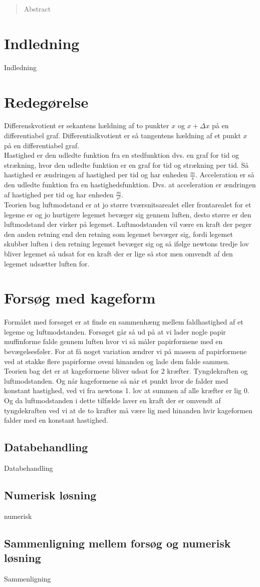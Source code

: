 \documentclass[12pt]{article}
\begin{document}
\tableofcontents
\pagebreak

\begin{abstract}
Abstract
\end{abstract}
\pagebreak

\section{Indledning}
Indledning
\section{Redegørelse}
Differenskvotient er sekantens hældning af to punkter $x$ og $x+\Delta x$ på en differentiabel graf.
Differentialkvotient er så tangentens hældning af et punkt $x$ på en differentiabel graf.\\
Hastighed er den udledte funktion fra en stedfunktion dvs. en graf for tid og strækning, hvor den udledte funktion er en graf for tid og strækning per tid. Så hastighed er ændringen af hastighed per tid og har enheden $\frac{m}{s}$.
Acceleration er så den udledte funktion fra en hastighedsfunktion. Dvs. at acceleration er ændringen af hastighed per tid og har enheden $\frac{m}{s^2}$.\\
Teorien bag luftmodstand er at jo større tværsnitsarealet eller frontarealet for et legeme er og jo hurtigere legemet bevæger sig gennem luften, desto større er den luftmodstand der virker på legemet. Luftmodstanden vil være en kraft der peger den anden retning end den retning som legemet bevæger sig,
fordi legemet skubber luften i den retning legemet bevæger sig og så ifølge newtons tredje lov bliver legemet så udsat for en kraft der er lige så stor men omvendt af den legemet udsætter luften for.


\section{Forsøg med kageform}
Formålet med forsøget er at finde en sammenhæng mellem faldhastighed af et legeme og luftmodstanden. Forsøget går så ud på at vi lader nogle papir muffinforme falde gennem luften
hvor vi så måler papirformene med en bevægelsesføler. For at få noget variation ændrer vi på massen af papirformene ved at stakke flere papirforme oveni hinanden og lade dem falde sammen.\\
Teorien bag det er at kageformene bliver udsat for 2 kræfter. Tyngdekraften og luftmodstanden. Og når kageformene så når et punkt hvor de falder med konstant hastighed, ved vi fra newtons 1. lov
at summen af alle kræfter er lig 0. Og da luftmodstanden i dette tilfælde laver en kraft der er omvendt af tyngdekraften ved vi at de to krafter må være lig med hinanden hvir kageformen falder med
en konstant hastighed.

\subsection{Databehandling}
Databehandling
\subsection{Numerisk løsning}
numerisk
\subsection{Sammenligning mellem forsøg og numerisk løsning}
Sammenligning
\end{document}
